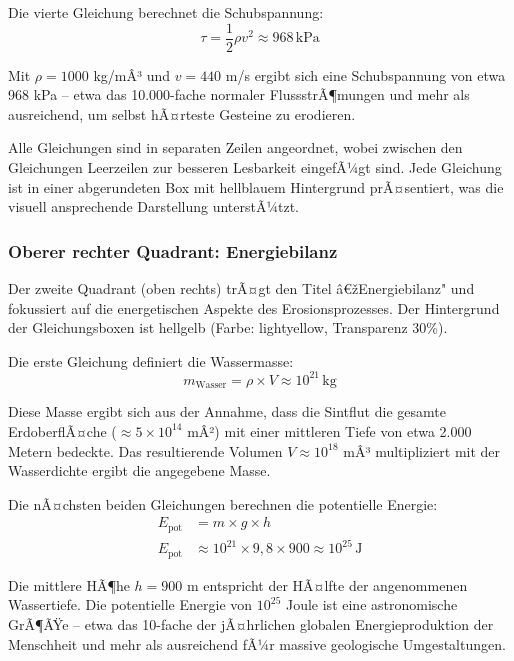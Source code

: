 Die vierte Gleichung berechnet die Schubspannung:
\begin{equation*}
\tau = \frac{1}{2} \rho v^2 \approx 968 \, \mathrm{kPa}
\end{equation*}

Mit $\rho = 1000$ kg/mÂ³ und $v = 440$ m/s ergibt sich eine Schubspannung von etwa 968 kPa -- etwa das 10.000-fache normaler FlussstrÃ¶mungen und mehr als ausreichend, um selbst hÃ¤rteste Gesteine zu erodieren.

Alle Gleichungen sind in separaten Zeilen angeordnet, wobei zwischen den Gleichungen Leerzeilen zur besseren Lesbarkeit eingefÃ¼gt sind. Jede Gleichung ist in einer abgerundeten Box mit hellblauem Hintergrund prÃ¤sentiert, was die visuell ansprechende Darstellung unterstÃ¼tzt.

\subsubsection*{Oberer rechter Quadrant: Energiebilanz}

Der zweite Quadrant (oben rechts) trÃ¤gt den Titel â€žEnergiebilanz" und fokussiert auf die energetischen Aspekte des Erosionsprozesses. Der Hintergrund der Gleichungsboxen ist hellgelb (Farbe: lightyellow, Transparenz 30\%).

Die erste Gleichung definiert die Wassermasse:
\begin{equation*}
m_{\mathrm{Wasser}} = \rho \times V \approx 10^{21} \, \mathrm{kg}
\end{equation*}

Diese Masse ergibt sich aus der Annahme, dass die Sintflut die gesamte ErdoberflÃ¤che ($\approx 5 \times 10^{14}$ mÂ²) mit einer mittleren Tiefe von etwa 2.000 Metern bedeckte. Das resultierende Volumen $V \approx 10^{18}$ mÂ³ multipliziert mit der Wasserdichte ergibt die angegebene Masse.

Die nÃ¤chsten beiden Gleichungen berechnen die potentielle Energie:
\begin{align*}
E_{\mathrm{pot}} &= m \times g \times h \\
E_{\mathrm{pot}} &\approx 10^{21} \times 9{,}8 \times 900 \approx 10^{25} \, \mathrm{J}
\end{align*}

Die mittlere HÃ¶he $h = 900$ m entspricht der HÃ¤lfte der angenommenen Wassertiefe. Die potentielle Energie von $10^{25}$ Joule ist eine astronomische GrÃ¶ÃŸe -- etwa das 10-fache der jÃ¤hrlichen globalen Energieproduktion der Menschheit und mehr als ausreichend fÃ¼r massive geologische Umgestaltungen.

